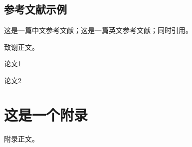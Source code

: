 \documentclass[format=draft,degree=bachelor]{hustthesis}
\begin{document}
\section{参考文献示例}
这是一篇中文参考文献\cite{TEXGURU99}；这是一篇英文参考文献\cite{knuth}；同时引用\cite{TEXGURU99,knuth}。

\backmatter

\begin{ack}
致谢正文。
\end{ack}



\listoffigures
\listoftables

\appendix

\begin{publications}
    \item 论文1
    \item 论文2
\end{publications}

\chapter{这是一个附录}
附录正文。
\end{document}
